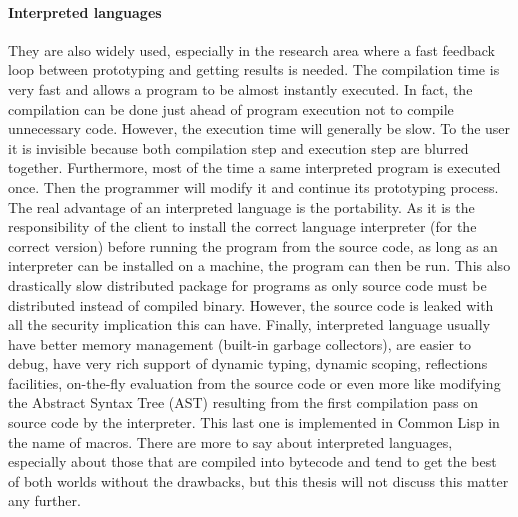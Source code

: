 \paragraph{Interpreted languages} They are also widely used, especially in the research area where a fast feedback loop
between prototyping and getting results is needed. The compilation time is very fast and allows a program to be almost
instantly executed. In fact, the compilation can be done just ahead of program execution not to compile unnecessary
code. However, the execution time will generally be slow. To the user it is invisible because both compilation step and
execution step are blurred together. Furthermore, most of the time a same interpreted program is executed once. Then the
programmer will modify it and continue its prototyping process. The real advantage of an interpreted language is the
portability. As it is the responsibility of the client to install the correct language interpreter (for the correct
version) before running the program from the source code, as long as an interpreter can be installed on a machine, the
program can then be run. This also drastically slow distributed package for programs as only source code must be
distributed instead of compiled binary. However, the source code is leaked with all the security implication this can
have. Finally, interpreted language usually have better memory management (built-in garbage collectors), are easier to
debug, have very rich support of dynamic typing, dynamic scoping, reflections facilities, on-the-fly evaluation from the
source code or even more like modifying the Abstract Syntax Tree (AST) resulting from the first compilation pass on
source code by the interpreter. This last one is implemented in Common Lisp in the name of macros. There are more to say
about interpreted languages, especially about those that are compiled into bytecode and tend to get the best of both
worlds without the drawbacks, but this thesis will not discuss this matter any further.

